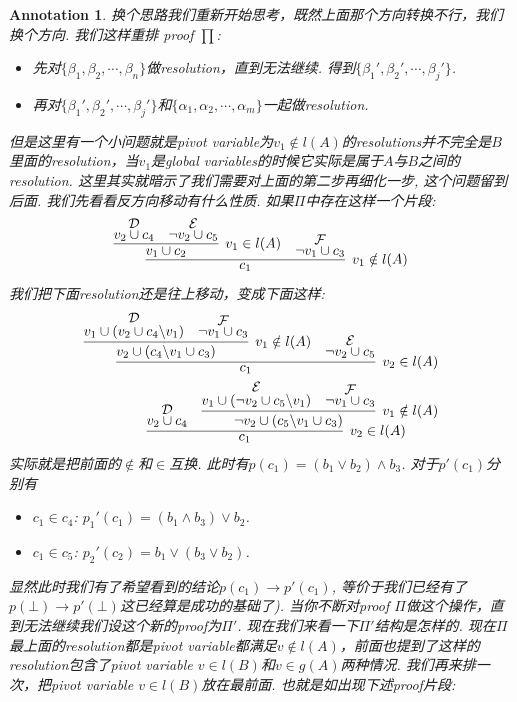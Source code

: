 \documentclass{article}
\newtheorem{annotation}[theorem]{Annotation}
\begin{document}
\begin{annotation}
换个思路我们重新开始思考，既然上面那个方向转换不行，我们换个方向. 我们这样重排 proof $\prod$:
\begin{itemize}
	\item 先对$\{\beta_1, \beta_2, \cdots, \beta_n\}$做resolution，直到无法继续. 得到$\{\beta_1', \beta_2', \cdots,\beta_j'\}$.
	\item 再对$\{\beta_1', \beta_2', \cdots,\beta_j'\}$和$\{\alpha_1, \alpha_2, \cdots, \alpha_m\}$一起做resolution.
\end{itemize}
但是这里有一个小问题就是pivot variable为$v_1 \notin l(A)$的resolutions并不完全是$B$里面的resolution，当$v_1$是global variables的时候它实际是属于$A$与$B$之间的resolution. 这里其实就暗示了我们需要对上面的第二步再细化一步, 这个问题留到后面. 我们先看看反方向移动有什么性质. 如果$\varPi$中存在这样一个片段:
\[
	\infer[v_1 \notin l(A)]{c_1}{\infer[v_1 \in l(A)]{v_1 \cup c_2}{\deduce{v_2 \cup c_4}{\mathcal{D}} & \deduce{\neg v_2 \cup c_5}{\mathcal{E}}} & \deduce{\neg v_1 \cup c_3}{\mathcal{F}}}
\]
我们把下面resolution还是往上移动，变成下面这样:
\[
	\begin{aligned}
	\infer[v_2 \in l(A)]{c_1}{\infer[v_1 \notin l(A)]{v_2 \cup (c_4 \backslash v_1 \cup c_3)}{\deduce{v_1 \cup (v_2 \cup c_4 \backslash v_1)}{\mathcal{D}} & \deduce{\neg v_1 \cup c_3}{\mathcal{F}}} & \deduce{\neg v_2 \cup c_5}{\mathcal{E}}}\\ 
	\infer[v_2 \in l(A)]{c_1}{\deduce{v_2 \cup c_4 }{\mathcal{D}} & \infer[v_1 \notin l(A)]{\neg v_2 \cup (c_5 \backslash v_1 \cup c_3)}{\deduce{v_1 \cup (\neg v_2 \cup c_5 \backslash v_1)}{\mathcal{E}} & \deduce{\neg v_1 \cup c_3}{\mathcal{F}}}}
	\end{aligned}
\]
实际就是把前面的$\notin$和$\in$互换. 此时有$p(c_1) = (b_1 \vee b_2) \wedge b_3$. 对于$p'(c_1)$分别有
\begin{itemize}
	\item $c_1 \in c_4$: $p_1'(c_1) = (b_1 \wedge b_3) \vee b_2 $.
	\item $c_1 \in c_5$: $p_2'(c_2) = b_1 \vee (b_3 \vee b_2)$.
\end{itemize}
显然此时我们有了希望看到的结论$p(c_1) \to p'(c_1)$, 等价于我们已经有了$p(\bot) \to p'(\bot)$这已经算是成功的基础了). 当你不断对proof $\varPi$做这个操作，直到无法继续我们设这个新的proof为$\varPi'$. 现在我们来看一下$\varPi'$结构是怎样的. 现在$\varPi$最上面的resolution都是pivot variable都满足$v \notin l(A)$，前面也提到了这样的resolution包含了pivot variable $v \in l(B)$和$v \in g(A)$两种情况. 我们再来排一次，把pivot variable $v \in l(B)$放在最前面. 也就是如出现下述proof片段:

\end{annotation}
\end{document}
